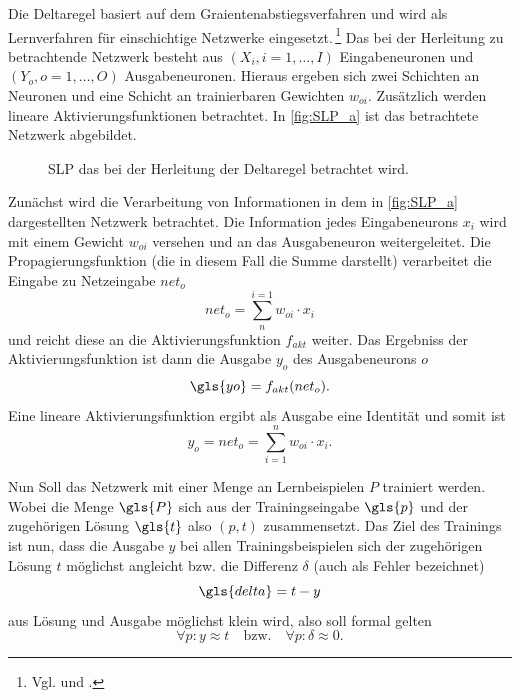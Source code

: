 Die Deltaregel basiert auf dem Graientenabstiegsverfahren und wird als Lernverfahren für einschichtige Netzwerke eingesetzt.\,\footnote{Vgl. \citet[79 ff]{dkriesel07} und \citet[322 ff]{Rumelhart1986}.} Das bei der Herleitung zu betrachtende Netzwerk besteht aus $(X_{i}, i=1,\dots,I)$ Eingabeneuronen und $(Y_{o}, o=1,\dots,O)$ Ausgabeneuronen. Hieraus ergeben sich zwei Schichten an Neuronen und eine Schicht an trainierbaren Gewichten $w_{oi}$. Zusätzlich werden lineare Aktivierungsfunktionen betrachtet. In \autoref{fig:SLP_a} ist das betrachtete Netzwerk abgebildet.


\begin{figure}[!htb]
    \centering
        
    \caption{SLP das bei der Herleitung der Deltaregel betrachtet wird.}
    \label{fig:SLP_a}
\end{figure}

Zunächst wird die Verarbeitung von Informationen in dem in \autoref{fig:SLP_a} dargestellten Netzwerk betrachtet. Die Information jedes Eingabeneurons $x_i$ wird mit einem Gewicht $w_{oi}$ versehen und an das Ausgabeneuron weitergeleitet. Die Propagierungsfunktion (die in diesem Fall die Summe darstellt) verarbeitet die Eingabe zu Netzeingabe $net_o$
\begin{equation}
net_o= \sum^{i=1}_n w_{oi} \cdot x_i
\end{equation}
und reicht diese an die Aktivierungsfunktion $f_{akt}$ weiter. Das Ergebniss der Aktivierungsfunktion ist dann die Ausgabe $y_o$ des Ausgabeneurons $o$
\begin{equation}
\gls{yo}= f_{akt}(net_o).
\end{equation}
Eine lineare Aktivierungsfunktion ergibt als Ausgabe eine Identität und somit ist
\begin{equation}
y_o= net_o= \sum_{i=1}^n w_{oi} \cdot x_i.
\label{gl:ausgang}
\end{equation}

Nun Soll das Netzwerk mit einer Menge an Lernbeispielen $P$ trainiert werden. Wobei die Menge $\gls{P}$ sich aus der Trainingseingabe $\gls{p}$ und der zugehörigen Lösung $\gls{t}$ also $(p,t)$ zusammensetzt.
Das Ziel des Trainings ist nun, dass die Ausgabe $y$ bei allen Trainingsbeispielen sich der zugehörigen Lösung $t$ möglichst angleicht bzw. die Differenz $\delta$ (auch als Fehler bezeichnet) 
\begin{equation}
\gls{delta}=t-y
\label{gl:delta}
\end{equation}
%
aus Lösung und Ausgabe möglichst klein  wird, also soll formal gelten
\begin{equation*}
\forall p:y \approx t \quad \text{bzw.} \quad \forall p:\delta \approx 0.
\end{equation*}

